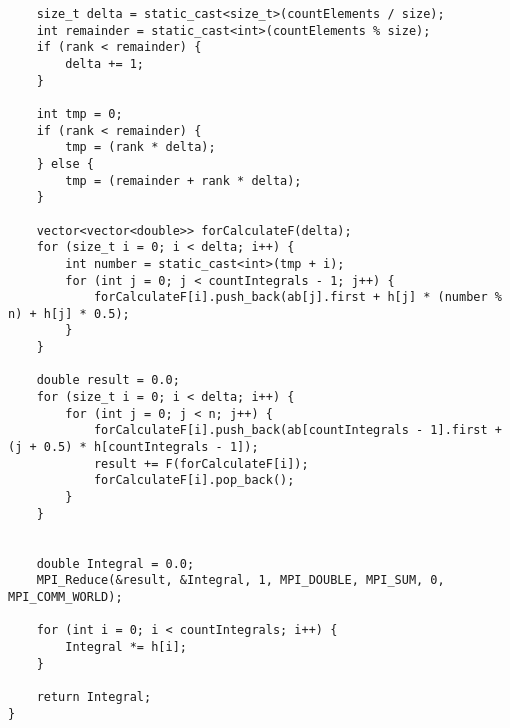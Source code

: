 \documentclass{report}
\begin{document}
\begin{lstlisting}
    size_t delta = static_cast<size_t>(countElements / size);
    int remainder = static_cast<int>(countElements % size);
    if (rank < remainder) {
        delta += 1;
    }

    int tmp = 0;
    if (rank < remainder) {
        tmp = (rank * delta);
    } else {
        tmp = (remainder + rank * delta);
    }

    vector<vector<double>> forCalculateF(delta);
    for (size_t i = 0; i < delta; i++) {
        int number = static_cast<int>(tmp + i);
        for (int j = 0; j < countIntegrals - 1; j++) {
            forCalculateF[i].push_back(ab[j].first + h[j] * (number % n) + h[j] * 0.5);
        }
    }

    double result = 0.0;
    for (size_t i = 0; i < delta; i++) {
        for (int j = 0; j < n; j++) {
            forCalculateF[i].push_back(ab[countIntegrals - 1].first + (j + 0.5) * h[countIntegrals - 1]);
            result += F(forCalculateF[i]);
            forCalculateF[i].pop_back();
        }
    }


    double Integral = 0.0;
    MPI_Reduce(&result, &Integral, 1, MPI_DOUBLE, MPI_SUM, 0, MPI_COMM_WORLD);

    for (int i = 0; i < countIntegrals; i++) {
        Integral *= h[i];
    }

    return Integral;
}

\end{lstlisting}
\end{document}
